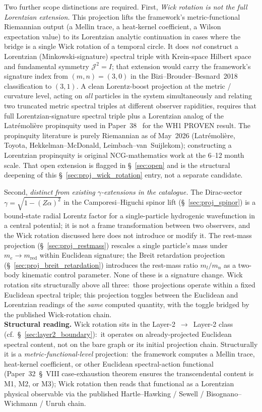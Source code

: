 \documentclass[11pt]{article}
\begin{document}
Two further scope distinctions are required.
First, \emph{Wick rotation is not the full Lorentzian extension.}
This projection lifts the framework's metric-functional Riemannian
output (a Mellin trace, a heat-kernel coefficient, a Wilson
expectation value) to its Lorentzian analytic continuation in
cases where the bridge is a single Wick rotation of a temporal
circle.  It does \emph{not} construct a Lorentzian (Minkowski-signature)
spectral triple with Krein-space Hilbert space and fundamental
symmetry $\mathcal{J}^2 = I$; that extension would carry the
framework's signature index from $(m,n) = (3, 0)$ in the
Bizi--Brouder--Besnard~2018~\cite{bizi_brouder_besnard2018}
classification to $(3, 1)$.  A clean Lorentz-boost projection at
the metric / curvature level, acting on \emph{all} particles in the
system simultaneously and relating two truncated metric spectral
triples at different observer rapidities, requires that full
Lorentzian-signature spectral triple plus a Lorentzian analog of
the Latr\'emoli\`ere propinquity used in Paper~38~\cite{paper38}
for the WH1 PROVEN result.  The propinquity literature is purely
Riemannian as of May~2026 (Latr\'emoli\`ere, Toyota,
Hekkelman--McDonald, Leimbach--van~Suijlekom); constructing a
Lorentzian propinquity is original NCG-mathematics work at the
6--12 month scale.  That open extension is flagged in
\S~\ref{sec:open} and is the structural deepening of this
\S~\ref{sec:proj_wick_rotation} entry, not a separate candidate.

Second, \emph{distinct from existing $\gamma$-extensions in the
catalogue.}  The Dirac-sector $\gamma = \sqrt{1 - (Z\alpha)^2}$ in
the Camporesi--Higuchi spinor lift (\S~\ref{sec:proj_spinor}) is a
bound-state radial Lorentz factor for a single-particle hydrogenic
wavefunction in a central potential; it is not a frame
transformation between two observers, and the Wick rotation
discussed here does not introduce or modify it.  The rest-mass
projection (\S~\ref{sec:proj_restmass}) rescales a single particle's
mass under $m_e \to m_\text{red}$ within Euclidean signature; the
Breit retardation projection
(\S~\ref{sec:proj_breit_retardation}) introduces the rest-mass
ratio $m_l/m_n$ as a two-body kinematic control parameter.  None of
these is a signature change.  Wick rotation sits structurally above
all three:\ those projections operate within a fixed Euclidean
spectral triple; this projection toggles between the Euclidean and
Lorentzian readings of the \emph{same} computed quantity, with the
toggle bridged by the published Wick-rotation chain.\\
\textbf{Structural reading.}  Wick rotation sits in the
Layer-2~$\to$~Layer-2 class (cf.\
\S~\ref{sec:layer2_boundary}):\ it operates on already-projected
Euclidean spectral content, not on the bare graph or its initial
projection chain.  Structurally it is a
\emph{metric-functional-level} projection:\ the framework computes a
Mellin trace, heat-kernel coefficient, or other Euclidean
spectral-action functional (Paper~32~\S~VIII case-exhaustion theorem
ensures the transcendental content is M1, M2, or M3); Wick rotation
then reads that functional as a Lorentzian physical observable via
the published Hartle--Hawking / Sewell / Bisognano--Wichmann / Unruh
chain.
\end{document}

